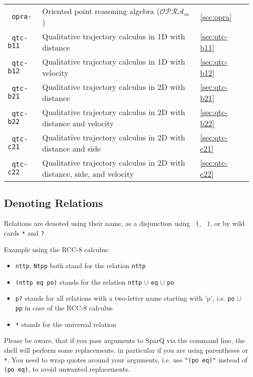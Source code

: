 \documentclass[headsepline]{scrreprt}
\theoremstyle{definition}
\newcommand{\engine}{SparQ}
\newcommand{\opra}{$\mathcal{OPRA}_m$}
\begin{document}
\begin{center}
\begin{longtable}{|p{4cm}p{6cm}ll|}
	\texttt{ opra-} & Oriented point reasoning algebra (\opra{})\citep{moratz06_opra} & \ref{sec:opra} & \pageref{sec:opra}\\
	\texttt{ qtc-b11} & Qualitative trajectory calculus in 1D with distance \citep{Weghe04_PhD} & \ref{sec:qtc-b11} & \pageref{sec:qtc-b11}\\
	\texttt{ qtc-b12} & Qualitative trajectory calculus in 1D with velocity \citep{Weghe04_PhD} & \ref{sec:qtc-b12} & \pageref{sec:qtc-b12}\\
	\texttt{ qtc-b21} & Qualitative trajectory calculus in 2D with distance \citep{Weghe04_PhD} & \ref{sec:qtc-b21} & \pageref{sec:qtc-b21}\\
	\texttt{ qtc-b22} & Qualitative trajectory calculus in 2D with distance and velocity \citep{Weghe04_PhD} & \ref{sec:qtc-b22} & \pageref{sec:qtc-b22}\\
	\texttt{ qtc-c21} & Qualitative trajectory calculus in 2D with distance and side \citep{Weghe04_PhD} & \ref{sec:qtc-c21} & \pageref{sec:qtc-c21}\\
	\texttt{ qtc-c22} & Qualitative trajectory calculus in 2D with distance, side, and velocity \citep{Weghe04_PhD} & \ref{sec:qtc-c22} & \pageref{sec:qtc-c22}\\
	\hline
\end{longtable}
\end{center}
\renewcommand{\arraystretch}{1.0}


\subsection{Denoting Relations}
Relations are denoted using their name, as a disjunction using \texttt{ (}, \texttt{ )}, or by wild cards \verb=*= and \verb=?=.

\noindent Example using the RCC-8 calculus:\\
\begin{itemize}
	\item \verb=nttp=, \verb=Ntpp= both stand for the relation \verb=nttp=
	\item \verb=(nttp eq po)= stands for the relation \verb=nttp= $\cup$  \verb=eq= $\cup$  \verb=po=
	\item \verb=p?= stands for all relations with a two-letter name starting with 'p', i.e. \verb=po= $\cup$  \verb=pp= in case of the RCC-8 calculus
	\item \verb=*= stands for the universal relation
\end{itemize}

Please be aware, that if you pass arguments to \engine{} via the command line, the shell will perform some replacements, in particular if you are using parentheses or \verb=*=. You need to wrap quotes around your arguments, i.e. use \verb="(po eq)"= instead of \verb=(po eq)=, to avoid unwanted replacements.
\end{document}
